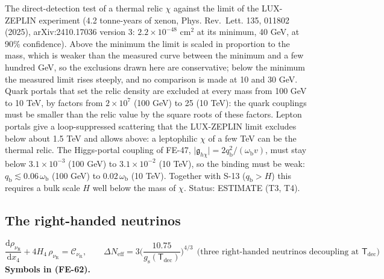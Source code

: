 \documentclass[
  10pt,
]{article}
\begin{document}
The direct-detection test of a thermal relic \(\chi\) against the limit
of the LUX-ZEPLIN experiment (4.2 tonne-years of xenon, Phys. Rev.~Lett.
135, 011802 (2025), arXiv:2410.17036 version 3: \(2.2\times10^{-48}\)
cm\(^2\) at its minimum, 40 GeV, at 90\% confidence). Above the minimum
the limit is scaled in proportion to the mass, which is weaker than the
measured curve between the minimum and a few hundred GeV, so the
exclusions drawn here are conservative; below the minimum the measured
limit rises steeply, and no comparison is made at 10 and 30 GeV. Quark
portals that set the relic density are excluded at every mass from 100
GeV to 10 TeV, by factors from \(2\times10^7\) (100 GeV) to 25 (10 TeV):
the quark couplings must be smaller than the relic value by the square
roots of these factors. Lepton portals give a loop-suppressed scattering
that the LUX-ZEPLIN limit excludes below about 1.5 TeV and allows above:
a leptophilic \(\chi\) of a few TeV can be the thermal relic. The
Higgs-portal coupling of FE-47,
\(\lvert\mathfrak{g}_{h\chi}\rvert = 2q_{\mathrm{b}}^2/(\omega_{\mathrm{b}}v)\),
must stay below \(3.1\times10^{-3}\) (100 GeV) to \(3.1\times10^{-2}\)
(10 TeV), so the binding must be weak:
\(q_{\mathrm{b}} \lesssim 0.06\,\omega_{\mathrm{b}}\) (100 GeV) to
\(0.02\,\omega_{\mathrm{b}}\) (10 TeV). Together with S-13
(\(q_{\mathrm{b}} > H\)) this requires a bulk scale \(H\) well below the
mass of \(\chi\). Status: ESTIMATE (T3, T4).

\hypertarget{the-right-handed-neutrinos}{%
\subsection{The right-handed
neutrinos}\label{the-right-handed-neutrinos}}

\[
\frac{\mathrm{d}\rho_{\nu_{\mathrm{R}}}}{\mathrm{d}x_4} + 4H_4\,\rho_{\nu_{\mathrm{R}}} = \mathcal{C}_{\nu_{\mathrm{R}}},\qquad
\Delta N_{\mathrm{eff}} = 3\Big(\frac{10.75}{g_{\mathrm{s}}(\mathsf{T}_{\mathrm{dec}})}\Big)^{4/3}\ \ \text{(three right-handed neutrinos decoupling at } \mathsf{T}_{\mathrm{dec}}) \tag{FE-62}
\] \textbf{Symbols in (FE-62).}
\end{document}
